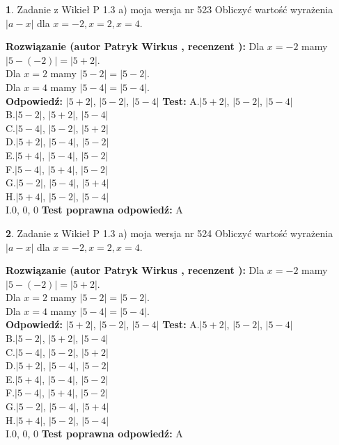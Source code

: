 \documentclass[12pt, a4paper]{article}
\theoremstyle{definition} %
\newtheorem{zad}{}
\newcommand{\zadStart}[1]{\begin{zad}#1\newline}
\newcommand{\zadStop}{\end{zad}}
\newcommand{\rozwStart}[2]{\noindent \textbf{Rozwiązanie (autor #1 , recenzent #2): }\newline}
\newcommand{\rozwStop}{\newline}
\newcommand{\odpStart}{\noindent \textbf{Odpowiedź:}\newline}
\newcommand{\odpStop}{\newline}
\newcommand{\testStart}{\noindent \textbf{Test:}\newline}
\newcommand{\testStop}{\newline}
\newcommand{\kluczStart}{\noindent \textbf{Test poprawna odpowiedź:}\newline}
\newcommand{\kluczStop}{\newline}
\begin{document}
\zadStart{Zadanie z Wikieł P 1.3 a) moja wersja nr 523}
Obliczyć wartość wyrażenia $|a - x|$ dla $x=-2,x=2,x=4$.
\zadStop
\rozwStart{Patryk Wirkus}{}
Dla $x = -2$ mamy $|5 - (-2)| = |5 + 2|$.\\
Dla $x = 2$ mamy $|5 - 2| = |5 - 2|$.\\
Dla $x = 4$ mamy $|5 - 4| = |5 - 4|$.\\
\rozwStop
\odpStart
$|5 + 2|$, $|5 - 2|$, $|5 - 4|$
\odpStop
\testStart
A.$|5 + 2|$, $|5 - 2|$, $|5 - 4|$\\
B.$|5 - 2|$, $|5 + 2|$, $|5 - 4|$\\
C.$|5 - 4|$, $|5 - 2|$, $|5 + 2|$\\
D.$|5 + 2|$, $|5 - 4|$, $|5 - 2|$\\
E.$|5 + 4|$, $|5 - 4|$, $|5 - 2|$\\
F.$|5 - 4|$, $|5 + 4|$, $|5 - 2|$\\
G.$|5 - 2|$, $|5 - 4|$, $|5 + 4|$\\
H.$|5 + 4|$, $|5 - 2|$, $|5 - 4|$\\
I.$0$, $0$, $0$
\testStop
\kluczStart
A
\kluczStop



\zadStart{Zadanie z Wikieł P 1.3 a) moja wersja nr 524}
Obliczyć wartość wyrażenia $|a - x|$ dla $x=-2,x=2,x=4$.
\zadStop
\rozwStart{Patryk Wirkus}{}
Dla $x = -2$ mamy $|5 - (-2)| = |5 + 2|$.\\
Dla $x = 2$ mamy $|5 - 2| = |5 - 2|$.\\
Dla $x = 4$ mamy $|5 - 4| = |5 - 4|$.\\
\rozwStop
\odpStart
$|5 + 2|$, $|5 - 2|$, $|5 - 4|$
\odpStop
\testStart
A.$|5 + 2|$, $|5 - 2|$, $|5 - 4|$\\
B.$|5 - 2|$, $|5 + 2|$, $|5 - 4|$\\
C.$|5 - 4|$, $|5 - 2|$, $|5 + 2|$\\
D.$|5 + 2|$, $|5 - 4|$, $|5 - 2|$\\
E.$|5 + 4|$, $|5 - 4|$, $|5 - 2|$\\
F.$|5 - 4|$, $|5 + 4|$, $|5 - 2|$\\
G.$|5 - 2|$, $|5 - 4|$, $|5 + 4|$\\
H.$|5 + 4|$, $|5 - 2|$, $|5 - 4|$\\
I.$0$, $0$, $0$
\testStop
\kluczStart
A
\kluczStop
\end{document}
